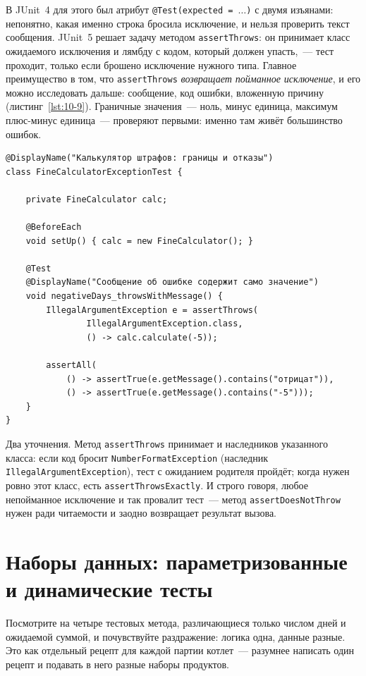 В JUnit~4 для этого был атрибут \texttt{@Test(expected = $\ldots$)} с двумя изъянами: непонятно, какая именно строка бросила исключение, и нельзя проверить текст сообщения. JUnit~5 решает задачу методом \texttt{assertThrows}: он принимает класс ожидаемого исключения и лямбду с кодом, который должен упасть,~--- тест проходит, только если брошено исключение нужного типа. Главное преимущество в том, что \texttt{assertThrows} \emph{возвращает пойманное исключение}, и его можно исследовать дальше: сообщение, код ошибки, вложенную причину (листинг~\ref{lst:10-9}). Граничные значения~--- ноль, минус единица, максимум плюс-минус единица~--- проверяют первыми: именно там живёт большинство ошибок.

\begin{listing}[H]
\begin{verbatim}
@DisplayName("Калькулятор штрафов: границы и отказы")
class FineCalculatorExceptionTest {

    private FineCalculator calc;

    @BeforeEach
    void setUp() { calc = new FineCalculator(); }

    @Test
    @DisplayName("Сообщение об ошибке содержит само значение")
    void negativeDays_throwsWithMessage() {
        IllegalArgumentException e = assertThrows(
                IllegalArgumentException.class,
                () -> calc.calculate(-5));

        assertAll(
            () -> assertTrue(e.getMessage().contains("отрицат")),
            () -> assertTrue(e.getMessage().contains("-5")));
    }
}
\end{verbatim}
\caption{Проверка отказов и граничных значений}
\label{lst:10-9}
\end{listing}

Два уточнения. Метод \texttt{assertThrows} принимает и наследников указанного класса: если код бросит \texttt{NumberFormatException} (наследник \texttt{IllegalArgumentException}), тест с ожиданием родителя пройдёт; когда нужен ровно этот класс, есть \texttt{assertThrowsExactly}. И строго говоря, любое непойманное исключение и так провалит тест~--- метод \texttt{assertDoesNotThrow} нужен ради читаемости и заодно возвращает результат вызова.

\section{Наборы данных: параметризованные и динамические тесты}

Посмотрите на четыре тестовых метода, различающиеся только числом дней и ожидаемой суммой, и почувствуйте раздражение: логика одна, данные разные. Это как отдельный рецепт для каждой партии котлет~--- разумнее написать один рецепт и подавать в него разные наборы продуктов.

